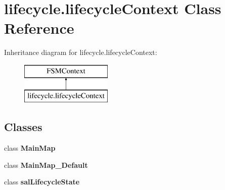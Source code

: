 \hypertarget{classlifecycle_1_1lifecycle_context}{\section{lifecycle.\-lifecycle\-Context Class Reference}
\label{classlifecycle_1_1lifecycle_context}
}
Inheritance diagram for lifecycle.\-lifecycle\-Context\-:\begin{figure}[H]
\begin{center}
\leavevmode
\includegraphics[height=2.000000cm]{classlifecycle_1_1lifecycle_context}
\end{center}
\end{figure}
\subsection*{Classes}
\begin{DoxyCompactItemize}
\item 
class {\bfseries Main\-Map}
\item 
class {\bfseries Main\-Map\-\_\-\-Default}
\item 
class {\bfseries sal\-Lifecycle\-State}
\end{DoxyCompactItemize}
